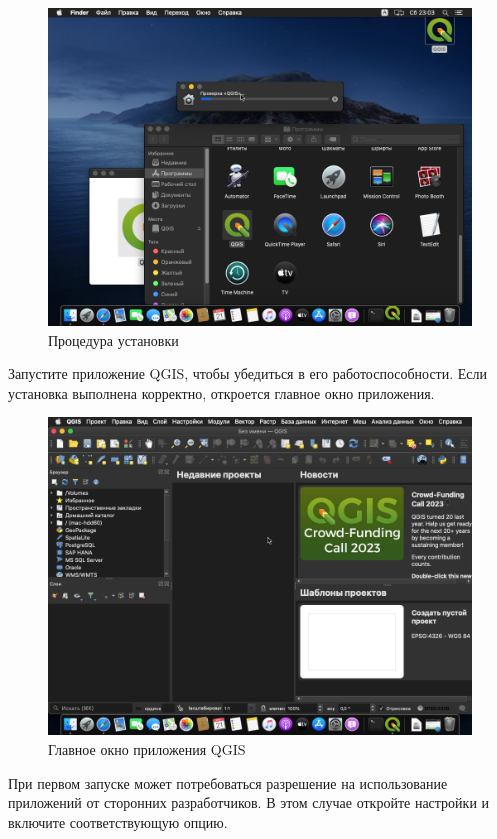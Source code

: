 \documentclass[
  12pt,
]{book}
\begin{document}
\begin{figure}
\centering
\includegraphics{images/installation_instruction_mac/mac06.png}
\caption{Процедура установки}
\end{figure}

Запустите приложение QGIS, чтобы убедиться в его работоспособности. Если установка выполнена корректно, откроется главное окно приложения.

\begin{figure}
\centering
\includegraphics{images/installation_instruction_mac/mac07.png}
\caption{Главное окно приложения QGIS}
\end{figure}

При первом запуске может потребоваться разрешение на использование приложений от сторонних разработчиков. В этом случае откройте настройки и включите соответствующую опцию.
\end{document}
